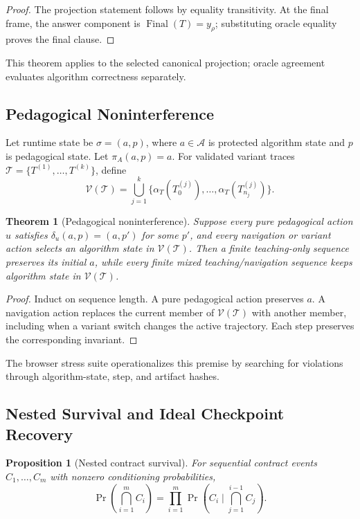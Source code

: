 \documentclass[letterpaper]{article}
\newtheorem{theorem}{Theorem}
\newtheorem{proposition}{Proposition}
\begin{document}
\begin{proof}
The projection statement follows by equality transitivity. At the final frame, the answer component is $\operatorname{Final}(T)=y_\rho$; substituting oracle equality proves the final clause.
\end{proof}

This theorem applies to the selected canonical projection; oracle agreement evaluates algorithm correctness separately.

\subsection{Pedagogical Noninterference}

Let runtime state be $\sigma=(a,p)$, where $a\in\mathcal{A}$ is protected algorithm state and $p$ is pedagogical state. Let $\pi_A(a,p)=a$. For validated variant traces $\mathcal{T}=\{T^{(1)},\ldots,T^{(k)}\}$, define
\[
\mathcal{V}(\mathcal{T})=
\bigcup_{j=1}^{k}
\{\alpha_T(T^{(j)}_0),\ldots,\alpha_T(T^{(j)}_{n_j})\}.
\]

\begin{theorem}[Pedagogical noninterference]
Suppose every pure pedagogical action $u$ satisfies
$\delta_u(a,p)=(a,p')$ for some $p'$, and every navigation or variant action selects an algorithm state in $\mathcal{V}(\mathcal{T})$. Then a finite teaching-only sequence preserves its initial $a$, while every finite mixed teaching/navigation sequence keeps algorithm state in $\mathcal{V}(\mathcal{T})$.
\end{theorem}

\begin{proof}
Induct on sequence length. A pure pedagogical action preserves $a$. A navigation action replaces the current member of $\mathcal{V}(\mathcal{T})$ with another member, including when a variant switch changes the active trajectory. Each step preserves the corresponding invariant.
\end{proof}

The browser stress suite operationalizes this premise by searching for violations through algorithm-state, step, and artifact hashes.

\subsection{Nested Survival and Ideal Checkpoint Recovery}

\begin{proposition}[Nested contract survival]
For sequential contract events $C_1,\ldots,C_m$ with nonzero conditioning probabilities,
\[
\Pr\!\left(\bigcap_{i=1}^{m}C_i\right)
=\prod_{i=1}^{m}
\Pr\!\left(C_i\mid \bigcap_{j=1}^{i-1}C_j\right).
\]
\end{proposition}
\end{document}
